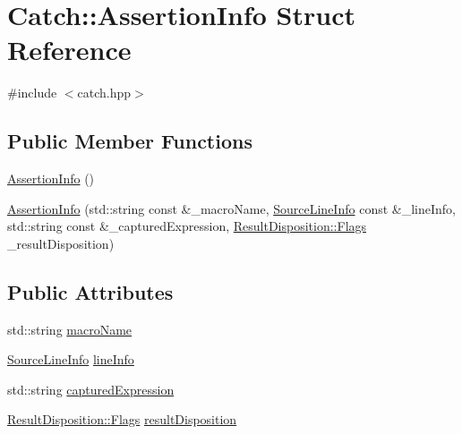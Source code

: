 \hypertarget{structCatch_1_1AssertionInfo}{\section{Catch\-:\-:Assertion\-Info Struct Reference}
\label{structCatch_1_1AssertionInfo}
}


{\ttfamily \#include $<$catch.\-hpp$>$}

\subsection*{Public Member Functions}
\begin{DoxyCompactItemize}
\item 
\hyperlink{structCatch_1_1AssertionInfo_a15c29d306c86361f842a0351a6003b9f}{Assertion\-Info} ()
\item 
\hyperlink{structCatch_1_1AssertionInfo_aaf6cc3eebd40391e54d37ed42953c73f}{Assertion\-Info} (std\-::string const \&\-\_\-macro\-Name, \hyperlink{structCatch_1_1SourceLineInfo}{Source\-Line\-Info} const \&\-\_\-line\-Info, std\-::string const \&\-\_\-captured\-Expression, \hyperlink{structCatch_1_1ResultDisposition_a3396cad6e2259af326b3aae93e23e9d8}{Result\-Disposition\-::\-Flags} \-\_\-result\-Disposition)
\end{DoxyCompactItemize}
\subsection*{Public Attributes}
\begin{DoxyCompactItemize}
\item 
std\-::string \hyperlink{structCatch_1_1AssertionInfo_ac2e59e8c89e00eb3390768f50d540b18}{macro\-Name}
\item 
\hyperlink{structCatch_1_1SourceLineInfo}{Source\-Line\-Info} \hyperlink{structCatch_1_1AssertionInfo_a17bdbb404ba12658034f833be2f4c3e7}{line\-Info}
\item 
std\-::string \hyperlink{structCatch_1_1AssertionInfo_af7c1d3cbfa346e9a303030fa0ef0cb54}{captured\-Expression}
\item 
\hyperlink{structCatch_1_1ResultDisposition_a3396cad6e2259af326b3aae93e23e9d8}{Result\-Disposition\-::\-Flags} \hyperlink{structCatch_1_1AssertionInfo_a60353b3632ab2f827162f2b2d6911073}{result\-Disposition}
\end{DoxyCompactItemize}


